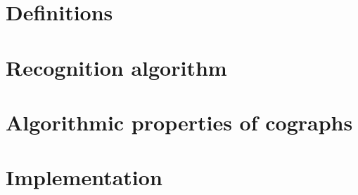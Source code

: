 \documentclass{report}
\begin{document}


\pagebreak
\tableofcontents

\pagebreak


\chapter{Definitions}


\chapter{Recognition algorithm}

\chapter{Algorithmic properties of cographs}

\chapter{Implementation}

\printbibliography
\end{document}
